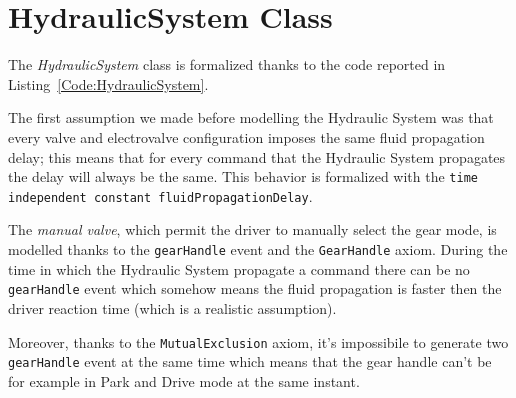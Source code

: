 \section{HydraulicSystem Class}
\label{Section:HydraulicSystem}
The \emph{HydraulicSystem} class is formalized thanks to the code reported in Listing~\ref{Code:HydraulicSystem}.

The first assumption we made before modelling the Hydraulic System was that every valve and electrovalve configuration imposes the same fluid propagation delay; this means that for every command that the Hydraulic System propagates the delay will always be the same. This behavior is formalized with the \texttt{time independent constant fluidPropagationDelay}.

The \emph{manual valve}, which permit the driver to manually select the gear mode, is modelled thanks to the \texttt{gearHandle} event and the \texttt{GearHandle} axiom. During the time in which the Hydraulic System propagate a command there can be no \texttt{gearHandle} event which somehow means the fluid propagation is faster then the driver reaction time (which is a realistic assumption).

Moreover, thanks to the \texttt{MutualExclusion} axiom, it's impossibile to generate two \texttt{gearHandle} event at the same time which means that the gear handle can't be for example in Park and Drive mode at the same instant.


